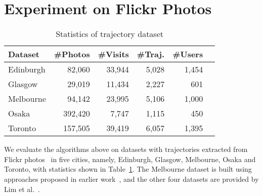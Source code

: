 
\setlength{\textfloatsep}{2em} %

\secmoveup
\section{Experiment on Flickr Photos}
\label{sec:experiment}






\begin{table}[t]
\caption{Statistics of trajectory dataset}
\label{tab:data}
\centering
\begin{tabular}{l*{5}{r}} \hline
\textbf{Dataset} & \textbf{\#Photos} & \textbf{\#Visits} & \textbf{\#Traj.} & \textbf{\#Users} \\ \hline
Edinburgh & 82,060 & 33,944 & 5,028 & 1,454 \\
Glasgow & 29,019 & 11,434 & 2,227 & 601 \\
Melbourne & 94,142 & 23,995 & 5,106 & 1,000 \\
Osaka & 392,420 & 7,747 & 1,115 & 450 \\
Toronto & 157,505 & 39,419 & 6,057 & 1,395 \\
\hline
\end{tabular}\captionmoveup
\end{table}


We evaluate the algorithms above on datasets with trajectories extracted from Flickr photos~\cite{thomee2016yfcc100m} in five cities,
namely, Edinburgh, Glasgow, Melbourne, Osaka and Toronto, with statistics shown in Table~\ref{tab:data}.
The Melbourne dataset is built using approaches proposed in earlier work~\cite{ht10, ijcai15},
and the other four datasets are provided by Lim et al.~\cite{ijcai15}.

